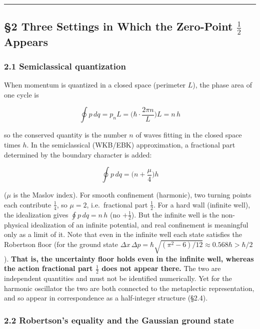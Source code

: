 \documentclass[
]{article}
\begin{document}
\begin{center}\rule{0.5\linewidth}{0.5pt}\end{center}

\subsection{\texorpdfstring{§2 Three Settings in Which the Zero-Point
\(\tfrac12\)
Appears}{§2 Three Settings in Which the Zero-Point \textbackslash tfrac12 Appears}}\label{three-settings-in-which-the-zero-point-tfrac12-appears}

\subsubsection{2.1 Semiclassical
quantization}\label{semiclassical-quantization}

When momentum is quantized in a closed space (perimeter \(L\)), the
phase area of one cycle is

\[\oint p\,dq = p_n L = \Big(\hbar\cdot\frac{2\pi n}{L}\Big)L = n\,h\]

so the conserved quantity is the number \(n\) of waves fitting in the
closed space times \(h\). In the semiclassical (WKB/EBK) approximation,
a fractional part determined by the boundary character is added:

\[\oint p\,dq = \Big(n+\frac{\mu}{4}\Big)h\]

(\(\mu\) is the Maslov index). For smooth confinement (harmonic), two
turning points each contribute \(\tfrac14\), so \(\mu=2\),
i.e.~fractional part \(\tfrac12\). For a hard wall (infinite well), the
idealization gives \(\oint p\,dq=n\,h\) (no \(+\tfrac12\)). But the
infinite well is the non-physical idealization of an infinite potential,
and real confinement is meaningful only as a limit of it. Note that even
in the infinite well each state satisfies the Robertson floor (for the
ground state
\(\Delta x\,\Delta p=\hbar\sqrt{(\pi^2-6)/12}\approx0.568\hbar>\hbar/2\)).
\textbf{That is, the uncertainty floor holds even in the infinite well,
whereas the action fractional part \(\tfrac12\) does not appear there.}
The two are independent quantities and must not be identified
numerically. Yet for the harmonic oscillator the two are both connected
to the metaplectic representation, and so appear in correspondence as a
half-integer structure (§2.4).

\subsubsection{2.2 Robertson's equality and the Gaussian ground
state}\label{robertsons-equality-and-the-gaussian-ground-state}
\end{document}
